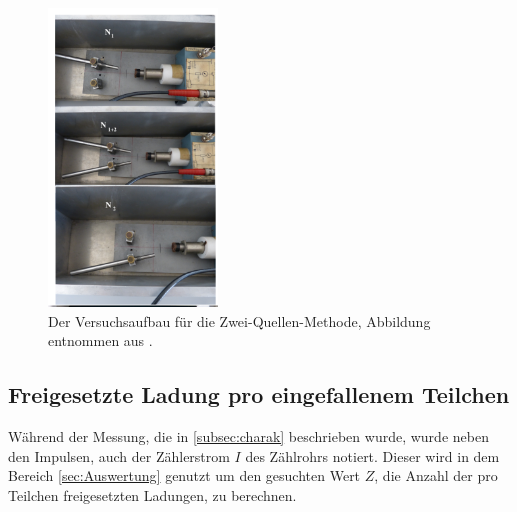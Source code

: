 \begin{figure}
    \centering
    \includegraphics[width=0.4\textwidth]{content/data/aufbau.png}
    \caption{Der Versuchsaufbau für die Zwei-Quellen-Methode, Abbildung entnommen aus \cite{anleitung}.}
    \label{fig:aufbau}
\end{figure}
\FloatBarrier
\subsection{Freigesetzte Ladung pro eingefallenem Teilchen}
Während der Messung, die in \ref{subsec:charak} beschrieben wurde, wurde neben den Impulsen, auch der Zählerstrom $I$ des Zählrohrs notiert.
Dieser wird in dem Bereich \ref{sec:Auswertung} genutzt um den gesuchten Wert $Z$, die Anzahl der pro Teilchen freigesetzten Ladungen, zu berechnen.